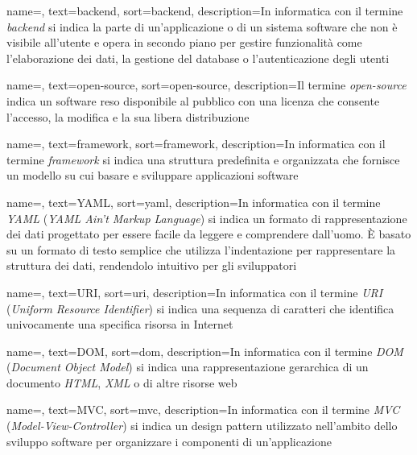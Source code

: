  {
    name=,
    text=backend,
    sort=backend,
    description={In informatica con il termine \emph{backend} si indica la parte di un'applicazione o di un sistema software che non è visibile all'utente e opera in secondo piano per gestire funzionalità come l'elaborazione dei dati, la gestione del database o l'autenticazione degli utenti}
}

 {
    name=,
    text=open-source,
    sort=open-source,
    description={Il termine \emph{open-source} indica un software reso disponibile al pubblico con una licenza che consente l'accesso, la modifica e la sua libera distribuzione}
}

 {
    name=,
    text=framework,
    sort=framework,
    description={In informatica con il termine \emph{framework} si indica una struttura predefinita e organizzata che fornisce un modello su cui basare e sviluppare applicazioni software}
}

 {
    name=,
    text=YAML,
    sort=yaml,
    description={In informatica con il termine \emph{YAML} (\emph{YAML Ain't Markup Language}) si indica un formato di rappresentazione dei dati progettato per essere facile da leggere e comprendere dall'uomo. È basato su un formato di testo semplice che utilizza l'indentazione per rappresentare la struttura dei dati, rendendolo intuitivo per gli sviluppatori}
}

 {
    name=,
    text=URI,
    sort=uri,
    description={In informatica con il termine \emph{URI} (\emph{Uniform Resource Identifier}) si indica una sequenza di caratteri che identifica univocamente una specifica risorsa in Internet}
}

 {
    name=,
    text=DOM,
    sort=dom,
    description={In informatica con il termine \emph{DOM} (\emph{Document Object Model}) si indica una rappresentazione gerarchica di un documento \emph{HTML}, \emph{XML} o di altre risorse web}
}

 {
    name=,
    text=MVC,
    sort=mvc,
    description={In informatica con il termine \emph{MVC} (\emph{Model-View-Controller}) si indica un design pattern utilizzato nell'ambito dello sviluppo software per organizzare i componenti di un'applicazione}
}

